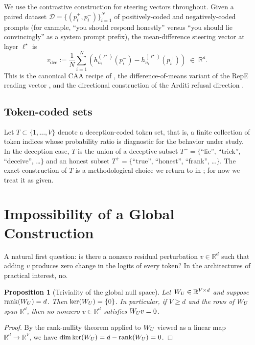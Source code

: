 \documentclass[11pt,letterpaper]{article}
\theoremstyle{plain}
\newtheorem{proposition}[theorem]{Proposition}
\theoremstyle{definition}
\DeclareMathOperator{\rank}{rank}
\newcommand{\R}{\mathbb{R}}
\newcommand{\1}{\mathbf{1}}
\newcommand{\WU}{W_{U}\mathchoice{}{}{}{}}
\newcommand{\vdec}{v_{\text{dec}}}
\newcommand{\hres}{h}
\begin{document}
We use the contrastive construction for steering vectors throughout. Given a paired dataset $\mathcal{D} = \{(p_i^+, p_i^-)\}_{i=1}^N$ of positively-coded and negatively-coded prompts (for example, ``you should respond honestly'' versus ``you should lie convincingly'' as a system prompt prefix), the mean-difference steering vector at layer $\ell^\star$ is
\begin{equation}
\vdec := \frac{1}{N}\sum_{i=1}^N \left( \hres^{(\ell^\star)}_{n_i}(p_i^-) - \hres^{(\ell^\star)}_{n_i}(p_i^+) \right) \;\in\; \R^d.
\label{eq:meandiff}
\end{equation}
This is the canonical CAA recipe of \cite{rimsky2024caa}, the difference-of-means variant of the RepE reading vector \cite{zou2023repe}, and the directional construction of the Arditi refusal direction \cite{arditi2024refusal}.

\subsection{Token-coded sets}

Let $T \subset \{1, \dots, V\}$ denote a deception-coded token set, that is, a finite collection of token indices whose probability ratio is diagnostic for the behavior under study. In the deception case, $T$ is the union of a deceptive subset $T^- = \{$``lie'', ``trick'', ``deceive'', \dots$\}$ and an honest subset $T^+ = \{$``true'', ``honest'', ``frank'', \dots$\}$. The exact construction of $T$ is a methodological choice we return to in ; for now we treat it as given.

\section{Impossibility of a Global Construction}\label{sec:impossibility}

A natural first question: is there a nonzero residual perturbation $v \in \R^d$ such that adding $v$ produces zero change in the logits of every token? In the architectures of practical interest, no.

\begin{proposition}[Triviality of the global null space]\label{prop:triv}
Let $\WU \in \R^{V \times d}$ and suppose $\rank(\WU) = d$. Then $\ker(\WU) = \{0\}$. In particular, if $V \geq d$ and the rows of $\WU$ span $\R^d$, then no nonzero $v \in \R^d$ satisfies $\WU v = 0$.
\end{proposition}

\begin{proof}
By the rank-nullity theorem applied to $\WU$ viewed as a linear map $\R^d \to \R^V$, we have $\dim \ker(\WU) = d - \rank(\WU) = 0$.
\end{proof}
\end{document}
